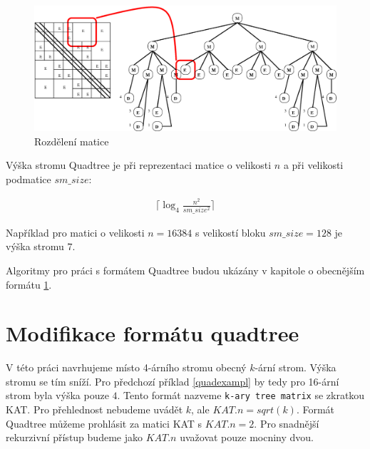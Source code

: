 \begin{figure}[htb]\centering
	\includegraphics[width=\textwidth]{./images/quadtree_sourceforge/quad2c.eps}
	\caption{Rozdělení matice}
	\label{fig:quad3}
\end{figure}


Výška stromu Quadtree je při reprezentaci matice o velikosti $n$ a při velikosti podmatice $sm\_size$:

\label{quadtreeheight}
\begin{align}
\Bigg\lceil\log_{4}\frac{n^2}{sm\_size^2}\Bigg\rceil
\end{align}

\label{quadexampl}
Například pro matici o velikosti $n=16384$ s velikostí bloku $sm\_size=128$ je výška stromu $7$.

Algoritmy pro práci s formátem Quadtree budou ukázány v kapitole o obecnějším formátu \ref{katchapter}.


\section{Modifikace formátu quadtree}
\label{katchapter}

V této práci navrhujeme místo 4-árního stromu obecný $k$-ární strom. Výška stromu se tím sníží. Pro předchozí příklad \ref{quadexampl} by tedy pro 16-ární strom byla výška pouze $4$. Tento formát nazveme \texttt{k-ary tree matrix} se zkratkou KAT. Pro přehlednost nebudeme uvádět $k$, ale $KAT.n = sqrt(k)$. Formát Quadtree můžeme prohlásit za matici KAT s $KAT.n = 2$. Pro snadnější rekurzivní přístup budeme jako $KAT.n$ uvažovat pouze mocniny dvou.

